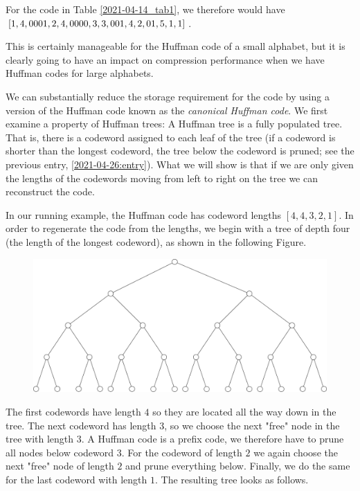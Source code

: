 For the code in Table \ref{2021-04-14_tab1}, we therefore would have $[1, 4, 0001, 2, 4, 0000, 3, 3, 001, \\ 4, 2, 01,  5, 1, 1]$.

This is certainly manageable for the Huffman code of a small alphabet, but it is clearly going to have an impact on compression performance when we have Huffman codes for large alphabets.

We can substantially reduce the storage requirement for the code by using a version of the Huffman code known as the \emph{canonical Huffman code}. We first examine a property of Huffman trees: A Huffman tree is a fully populated tree. That is, there is a codeword assigned to each leaf of the tree (if a codeword is shorter than the longest codeword, the tree below the codeword is pruned; see the previous entry, \ref{2021-04-26:entry}). What we will show is that if we are only given the lengths of the codewords moving from left to right on the tree we can reconstruct the code.

In our running example, the Huffman code has codeword lengths $[4, 4, 3, 2, 1]$. In order to regenerate the code from the lengths, we begin with a tree of depth four (the length of the longest codeword), as shown in the following Figure.

\begin{figure}[H]
    \centering
    \includegraphics[scale=0.4]{images/2021-05-03_tree_01.png}
\end{figure}


The first codewords have length $4$ so they are located all the way down in the tree. The next codeword has length $3$, so we choose the next "free" node in the tree with length $3$. A Huffman code is a prefix code, we therefore have to prune all nodes below codeword $3$. For the codeword of length $2$ we again choose the next "free" node of length $2$ and prune everything below. Finally, we do the same for the last codeword with length $1$. The resulting tree looks as follows.

